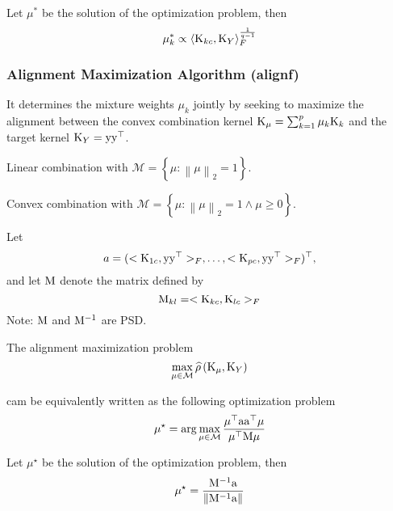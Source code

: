 \documentclass{ctexart}
\begin{document}
    Let ${\mu}^{\ast}$ be the solution of the optimization problem, then 
    \begin{equation}
        \mu^{\ast}_{k}\propto \left\langle {\rm K}_{kc}, {\rm K}_{Y}\right\rangle_F^{\frac{1}{q-1}}
    \end{equation}
    
    \subsubsection{Alignment Maximization Algorithm (alignf)}
    It determines the mixture weights $\mu_k$ jointly by seeking to maximize the alignment between the convex combination kernel ${\rm K}_{\mu}=\sum_{k=1}^{p}\mu_{k}{\rm K}_k$ and the target kernel ${\rm K}_Y={\rm y}{\rm y}^{\top}$.

    Linear combination with $\mathcal{M} = \left\{\mu: \left\lVert \mu\right\rVert_2 = 1\right\}$.

    Convex combination with $\mathcal{M} = \left\{\mu: \left\lVert \mu\right\rVert_2 = 1\wedge \mu \geq 0\right\}$.

    Let 
    \begin{equation}
        a = (<{\rm K}_{1c}, {\rm y}{\rm y}^{\top}>_F, \dots, <{\rm K}_{pc}, {\rm y}{\rm y}^{\top}>_F)^{\top},
    \end{equation}
    and let ${\rm M}$ denote the matrix defined by
    \begin{equation}
        {\rm M}_{kl} = <{\rm K}_{kc}, {\rm K}_{lc}>_F
    \end{equation}
    Note: ${\rm M}$ and ${\rm M}^{-1}$ are PSD.

    The alignment maximization problem
    \begin{equation}
        \max_{\mu\in\mathcal{M}} \widehat{\rho}\left({\rm K_{\mu}}, {\rm K}_Y\right)
    \end{equation}

    cam be equivalently written as the following optimization problem
    \begin{equation}
        \mu^{\star} = \arg\max_{\mu\in\mathcal{M}} \frac{\mu^{\top}{\rm a}{\rm a}^{\top}\mu}{\mu^{\top}{\rm M}\mu}
    \end{equation}

    Let ${\mu}^{\star}$ be the solution of the optimization problem, then
    \begin{equation}
        \mu^{\star} = \frac{{\rm M}^{-1}{\rm a}}{\left\lVert {\rm M}^{-1}{\rm a}\right\rVert}
    \end{equation}
\end{document}
